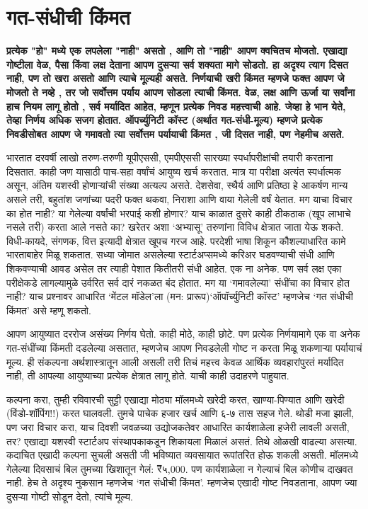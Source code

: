 \chapter{गत-संधीची किंमत}

\textcolor{blue!60!black}{\textbf{प्रत्येक "हो" मध्ये एक लपलेला "नाही" असतो , आणि तो "नाही" आपण क्वचितच मोजतो. एखाद्या गोष्टीला वेळ, पैसा किंवा लक्ष देताना आपण दुसऱ्या सर्व शक्यता मागे सोडतो. हा अदृश्य त्याग दिसत नाही, पण तो खरा असतो आणि त्याचे मूल्यही असते. निर्णयाची खरी किंमत म्हणजे फक्त आपण जे मोजतो ते नव्हे , तर जो सर्वोत्तम पर्याय आपण सोडला त्याची किंमत. वेळ, लक्ष आणि ऊर्जा या सर्वांना हाच नियम लागू होतो , सर्व मर्यादित आहेत, म्हणून प्रत्येक निवड महत्त्वाची आहे. जेव्हा हे भान येते, तेव्हा निर्णय अधिक सजग होतात. ऑपर्च्युनिटी कॉस्ट (अर्थात गत-संधी-मूल्य) म्हणजे प्रत्येक निवडीसोबत आपण जे गमावतो त्या सर्वोत्तम पर्यायाची किंमत , जी दिसत नाही, पण नेहमीच असते.}}

भारतात दरवर्षी लाखो तरुण-तरुणी यूपीएससी, एमपीएससी सारख्या स्पर्धापरीक्षांची तयारी करताना दिसतात. काही जण यासाठी पाच-सहा वर्षांचं आयुष्य खर्च करतात. मात्र या परीक्षा अत्यंत स्पर्धात्मक असून, अंतिम यशस्वी होणाऱ्यांची संख्या अत्यल्प असते. देशसेवा, स्थैर्य आणि प्रतिष्ठा हे आकर्षण मान्य असले तरी, बहुतांश जणांच्या पदरी फक्त थकवा, निराशा आणि वाया गेलेली वर्षं येतात. मग याचा विचार का होत नाही? या गेलेल्या वर्षांची भरपाई कशी होणार? याच काळात दुसरे काही ठीकठाक (खूप लाभाचे नसले तरी) करता आले नसते का? खरेतर अशा ‘अभ्यासू’ तरुणांना विविध क्षेत्रात जाता येऊ शकते. विधी-कायदे, संगणक, वित्त इत्यादी क्षेत्रात खूपच गरज आहे. परदेशी भाषा शिकून कौशल्याधारित कामे भारताबाहेर मिळू शकतात.  सध्या जोमात असलेल्या स्टार्टअप्समध्ये करिअर घडवण्याची संधी आणि शिकवण्याची आवड असेल तर त्याही पेशात कितीतरी संधी आहेत.  एक ना अनेक. पण सर्व लक्ष एका परीक्षेकडे लागल्यामुळे उर्वरित सर्व दारं नकळत बंद होतात. मग या ‘गमावलेल्या’ संधींचा का विचार होत नाही? याच प्रश्नावर आधारित ‘मेंटल मॉडेल’ला (मन: प्रारूप)‘ऑपॉर्च्युनिटी कॉस्ट’ म्हणजेच ‘गत संधीची किंमत’ असे म्हणू शकतो. 

आपण आयुष्यात दररोज असंख्य निर्णय घेतो. काही मोठे, काही छोटे. पण प्रत्येक निर्णयामागे एक वा अनेक गत-संधींच्या किंमती दडलेल्या असतात, म्हणजेच आपण निवडलेली गोष्ट न करता मिळू शकणाऱ्या पर्यायाचं मूल्य. ही संकल्पना अर्थशास्त्रातून आली असली तरी तिचं महत्त्व केवळ आर्थिक व्यवहारांपुरतं मर्यादित नाही, ती आपल्या आयुष्याच्या प्रत्येक क्षेत्रात लागू होते. याची काही उदाहरणे पाहुयात.

कल्पना करा, तुम्ही रविवारची सुट्टी एखाद्या मोठ्या मॉलमध्ये खरेदी करत, खाण्या-पिण्यात आणि खरेदी (विंडो-शॉपिंग!!) करत घालवली. तुमचे पाचेक हजार खर्च आणि ६-७ तास सहज गेले. थोडी मजा झाली, पण जरा विचार करा, याच दिवशी जवळच्या उद्योजकतेवर आधारित कार्यशाळेला हजेरी लावली असती, तर? एखाद्या यशस्वी स्टार्टअप संस्थापकाकडून शिकायला मिळालं असतं. तिथे ओळखी वाढल्या असत्या. कदाचित एखादी कल्पना सुचली असती जी भविष्यात व्यवसायात रूपांतरित होऊ शकली असती. मॉलमध्ये गेलेल्या दिवसाचं बिल तुमच्या खिशातून गेलं: ₹५,000. पण कार्यशाळेला न गेल्याचं बिल कोणीच दाखवत नाही. हेच ते अदृश्य नुकसान म्हणजेच ‘गत संधीची किंमत’. म्हणजेच  एखादी गोष्ट निवडताना, आपण ज्या दुसऱ्या गोष्टी सोडून देतो, त्यांचे मूल्य.

